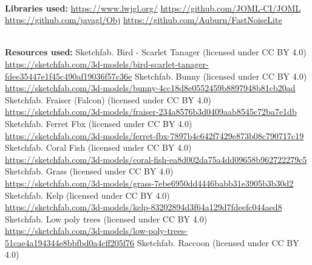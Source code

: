 \documentclass{article}
\begin{document}
\begin{thebibliography}{9}
        \textbf{\\ Libraries used:}
         \url{https://www.lwjgl.org/}
         \url{https://github.com/JOML-CI/JOML}
         \url{https://github.com/javagl/Obj}
         \url{https://github.com/Auburn/FastNoiseLite}

        \textbf{\\ Resources used:}
        Sketchfab. Bird - Scarlet Tanager (licensed under CC BY 4.0) \\
        \url{https://sketchfab.com/3d-models/bird-scarlet-tanager-fdee35447e1f45c490af19036f57c36e}
        Sketchfab. Bunny (licensed under CC BY 4.0) \\
        \url{https://sketchfab.com/3d-models/bunny-4cc18d8e0552459b8897948b81cb20ad}
        Sketchfab. Fraiser (Falcon) (licensed under CC BY 4.0) \\
        \url{https://sketchfab.com/3d-models/fraiser-234a8576b3d0409aab8545c72ba7e1db}
        Sketchfab. Ferret Fbx (licensed under CC BY 4.0) \\
        \url{https://sketchfab.com/3d-models/ferret-fbx-7897b4c642f7429e873b08c790717c19}
        Sketchfab. Coral Fish (licensed under CC BY 4.0) \\
        \url{https://sketchfab.com/3d-models/coral-fish-ea8d002da75a4dd09658b962722279c5}
        Sketchfab. Grass (licensed under CC BY 4.0) \\
        \url{https://sketchfab.com/3d-models/grass-7ebe6950dd4446babb31e3905b3b30d2}
        Sketchfab. Kelp (licensed under CC BY 4.0) \\
        \url{https://sketchfab.com/3d-models/kelp-83202894d3f64a129d7fdeefc044aed8}
        Sketchfab. Low poly trees (licensed under CC BY 4.0) \\
        \url{https://sketchfab.com/3d-models/low-poly-trees-51cae4a194344e8bbfbd0a4cff205f76}
        Sketchfab. Raccoon (licensed under CC BY 4.0) \\

\end{thebibliography}
\end{document}
